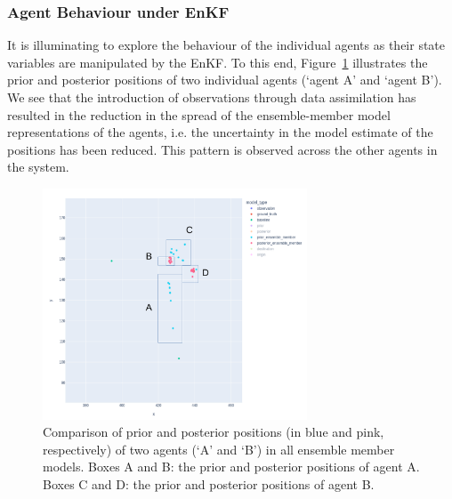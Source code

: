 \documentclass{article}
\begin{document}

\subsubsection*{Agent Behaviour under EnKF}

It is illuminating to explore the behaviour of the individual agents as their state variables are manipulated by the EnKF. To this end, Figure~\ref{fig:gcs_updating} illustrates the prior and posterior positions of two individual agents (`agent A' and `agent B'). We see that the introduction of observations through data assimilation has resulted in the reduction in the spread of the ensemble-member model representations of the
agents, i.e. the uncertainty in the model estimate of the positions has been reduced. This pattern is observed across the other agents in the system.


\begin{figure}[htb]
	\centering
	\includegraphics[width=0.7\textwidth]{figures/updating_state.pdf}
	\caption{Comparison of prior and posterior positions (in blue and pink, respectively) of two agents (`A' and `B') in all ensemble member models. 
		Boxes A and B: the prior and posterior positions of agent A.
		Boxes C and D: the prior and posterior positions of agent B.}\label{fig:gcs_updating}
\end{figure}
\end{document}
